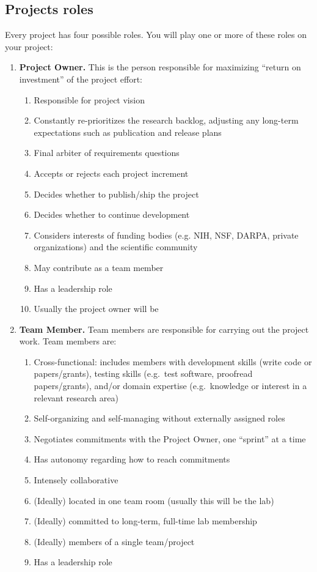 \documentclass{tufte-book} %
\begin{document}
\subsection{Projects roles}
Every project has four possible roles.  You will play one or more of
these roles on your project:
\begin{enumerate}
\item \textbf{Project Owner.}  This is the person responsible for
  maximizing ``return on investment'' of the project effort:
\begin{enumerate}
\item Responsible for project vision
\item Constantly re-prioritizes the research backlog, adjusting any
  long-term expectations such as publication and release plans
\item Final arbiter of requirements questions
\item Accepts or rejects each project increment
\item Decides whether to publish/ship the project
\item Decides whether to continue development
\item Considers interests of funding bodies (e.g. NIH, NSF, DARPA,
  private organizations) and the scientific community
\item May contribute as a team member
\item Has a leadership role
\item Usually the project owner will be \director
\end{enumerate}

\item \textbf{Team Member.}  Team members are responsible for carrying
  out the project work.  Team members are:
\begin{enumerate}
\item Cross-functional: includes members with development skills
  (write code or papers/grants), testing skills (e.g.\ test software,
  proofread papers/grants), and/or domain expertise (e.g.\ knowledge
  or interest in a relevant research area)
\item Self-organizing and self-managing without externally assigned
  roles
\item Negotiates commitments with the Project Owner, one ``sprint'' at
  a time
\item Has autonomy regarding how to reach commitments
\item Intensely collaborative
\item (Ideally) located in one team room (usually this will be the lab)
\item (Ideally) committed to long-term, full-time lab membership
\item (Ideally) members of a single team/project
\item Has a leadership role
\end{enumerate}


\end{enumerate}
\end{document}
